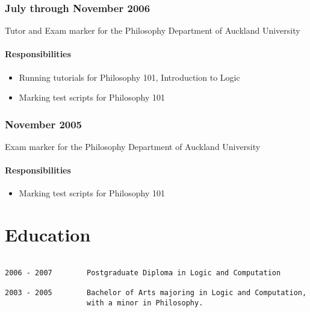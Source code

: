 \documentclass[10pt,oneside]{memoir}
\begin{document}
\subsection*{July through November 2006}
\label{julythroughnovember2006}

Tutor and Exam marker for the Philosophy Department of Auckland University


\subsubsection*{Responsibilities}
\label{responsibilities}

\begin{itemize}


\item Running tutorials for Philosophy 101, Introduction to Logic

\item Marking test scripts for Philosophy 101
\end{itemize}

\subsection*{November 2005}
\label{november2005}

Exam marker for the Philosophy Department of Auckland University


\subsubsection*{Responsibilities}
\label{responsibilities}

\begin{itemize}


\item Marking test scripts for Philosophy 101
\end{itemize}

\chapter{Education}
\label{education}

\begin{adjustwidth}{2.5em}{2.5em}
\begin{verbatim}

2006 - 2007        Postgraduate Diploma in Logic and Computation

2003 - 2005        Bachelor of Arts majoring in Logic and Computation,
                   with a minor in Philosophy.

\end{verbatim}
\end{adjustwidth}
\end{document}
